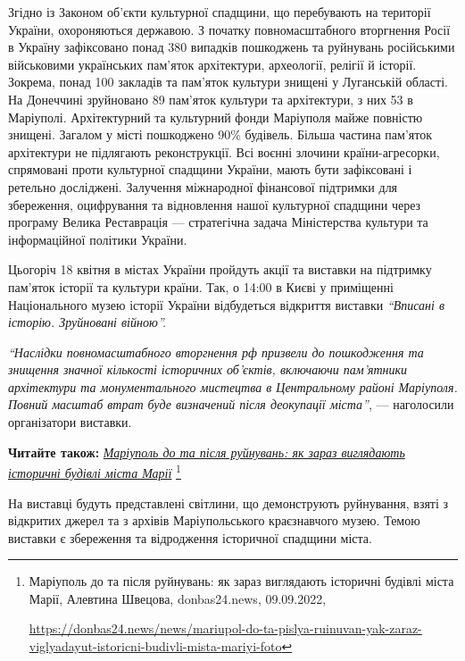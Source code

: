 Згідно із Законом об'єкти культурної спадщини, що перебувають на території
України, охороняються державою. З початку повномасштабного вторгнення Росії в
Україну зафіксовано понад 380 випадків пошкоджень та руйнувань російськими
військовими українських пам'яток архітектури, археології, релігії й історії.
Зокрема, понад 100 закладів та пам'яток культури знищені у Луганській області.
На Донеччині зруйновано 89 пам'яток культури та архітектури, з них 53 в
Маріуполі. Архітектурний та культурний фонди Маріуполя майже повністю знищені.
Загалом у місті пошкоджено 90\% будівель. Більша частина пам'яток архітектури не
підлягають реконструкції. Всі воєнні злочини країни-агресорки, спрямовані проти
культурної спадщини України, мають бути зафіксовані і ретельно досліджені.
Залучення міжнародної фінансової підтримки для збереження, оцифрування та
відновлення нашої культурної спадщини через програму Велика Реставрація —
стратегічна задача Міністерства культури та інформаційної політики України.

Цьогоріч 18 квітня в містах України пройдуть акції та виставки на підтримку
пам'яток історії та культури країни. Так, о 14:00 в Києві у приміщенні
Національного музею історії України відбудеться відкриття виставки \emph{\enquote{Вписані в
історію. Зруйновані війною}.}


\begin{leftbar}
\emph{\enquote{Наслідки повномасштабного вторгнення рф призвели до пошкодження та знищення
значної кількості історичних об'єктів, включаючи пам'ятники архітектури та
монументального мистецтва в Центральному районі Маріуполя. Повний масштаб втрат
буде визначений після деокупації міста}}, — наголосили організатори виставки.
\end{leftbar}

\textbf{Читайте також:} \href{https://donbas24.news/news/mariupol-do-ta-pislya-ruinuvan-yak-zaraz-viglyadayut-istoricni-budivli-mista-mariyi-foto}{\emph{Маріуполь до та після руйнувань: як зараз виглядають історичні будівлі міста Марії}}%
\footnote{Маріуполь до та після руйнувань: як зараз виглядають історичні будівлі міста Марії, Алевтина Швецова, donbas24.news, 09.09.2022, \par%
\url{https://donbas24.news/news/mariupol-do-ta-pislya-ruinuvan-yak-zaraz-viglyadayut-istoricni-budivli-mista-mariyi-foto}%
}

На виставці будуть представлені світлини, що демонструють руйнування, взяті з
відкритих джерел та з архівів Маріупольського краєзнавчого музею. Темою
виставки є збереження та відродження історичної спадщини міста.

